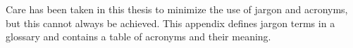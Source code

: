 Care has been taken in this thesis to minimize the use of jargon and
acronyms, but this cannot always be achieved. This appendix defines
jargon terms in a glossary and contains a table of acronyms and their
meaning.





